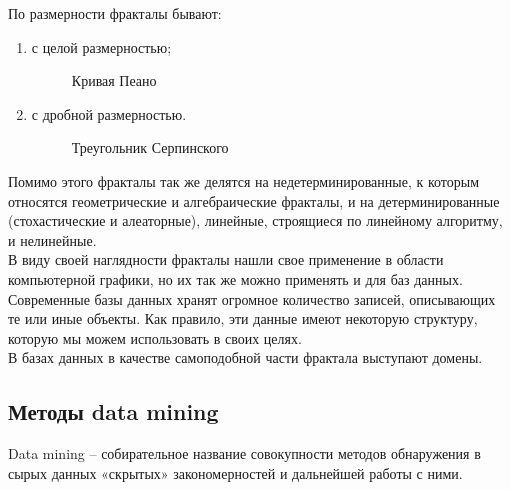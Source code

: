 По размерности фракталы бывают: 
\\
\begin{enumerate}
\item с целой размерностью;


\begin{figure}[H]
\caption{Кривая Пеано}
\label{ris:image}
\end{figure}

\item с дробной размерностью.


\begin{figure}[H]
\center{\texttt{[image: s]}}
\caption{Треугольник Серпинского}
\label{ris:image}
\end{figure}

\end{enumerate}

Помимо этого фракталы так же делятся на недетерминированные, к которым относятся геометрические и алгебраические фракталы, и на детерминированные (стохастические и алеаторные), линейные, строящиеся по линейному алгоритму, и нелинейные.
\\

В виду своей наглядности фракталы нашли свое применение в области компьютерной графики, но их так же можно применять и для баз данных. 
\\

Современные базы данных хранят огромное количество записей, описывающих те или иные объекты. Как правило, эти данные имеют некоторую структуру, которую мы можем использовать в своих целях.
\\
В базах данных в качестве самоподобной части фрактала выступают домены. 
\pagebreak
\subsection{Методы data mining}

Data mining – собирательное название совокупности методов обнаружения в сырых данных «скрытых» закономерностей и дальнейшей работы с ними.
\\

